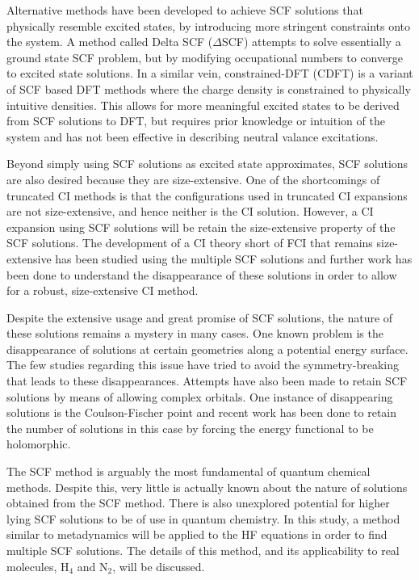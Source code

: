 \documentclass[final,3p,times,twocolumn]{elsarticle}
\begin{document}
Alternative methods have been developed to achieve SCF solutions that physically resemble excited states, by introducing more stringent constraints onto the system. A method called Delta SCF ($\Delta$SCF) attempts to solve essentially a ground state SCF problem, but by modifying occupational numbers to converge to excited state solutions.\cite{gunnarsson-1977,gavnholt-2008} In a similar vein, constrained-DFT (CDFT) is a variant of SCF based DFT methods where the charge density is constrained to physically intuitive densities.\cite{cdft} This allows for more meaningful excited states to be derived from SCF solutions to DFT, but requires prior knowledge or intuition of the system and has not been effective in describing neutral valance excitations.

Beyond simply using SCF solutions as excited state approximates, SCF solutions are also desired because they are size-extensive. One of the shortcomings of truncated CI methods\cite{shavitt} is that the configurations used in truncated CI expansions are not size-extensive, and hence neither is the CI solution. However, a CI expansion using SCF solutions will be retain the size-extensive property of the SCF solutions. The development of a CI theory short of FCI that remains size-extensive has been studied using the multiple SCF solutions\cite{thom-2009} and further work has been done to understand the disappearance of these solutions in order to allow for a robust, size-extensive CI method.\cite{thom-2014,thom-2016}

Despite the extensive usage and great promise of SCF solutions, the nature of these solutions remains a mystery in many cases. One known problem is the disappearance of solutions at certain geometries along a potential energy surface. The few studies regarding this issue have tried to avoid the symmetry-breaking that leads to these disappearances.\cite{scuseria-2011,scuseria-2013} Attempts have also been made to retain SCF solutions by means of allowing complex orbitals.\cite{sundstrom-2014} One instance of disappearing solutions is the Coulson-Fischer point\cite{coulson-fischer} and recent work has been done to retain the number of solutions in this case by forcing the energy functional to be holomorphic.\cite{thom-2014,thom-2016}

The SCF method is arguably the most fundamental of quantum chemical methods. Despite this, very little is actually known about the nature of solutions obtained from the SCF method. There is also unexplored potential for higher lying SCF solutions to be of use in quantum chemistry. In this study, a method similar to metadynamics will be applied to the HF equations in order to find multiple SCF solutions. The details of this method, and its applicability to real molecules, H$_4$ and N$_2$, will be discussed.
\end{document}
